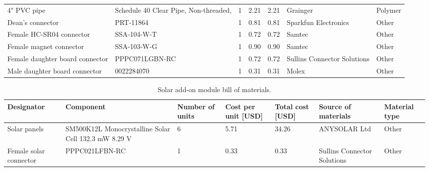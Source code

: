 \documentclass[11pt,letterpaper]{article}
\begin{document}
\begin{longtable}{ p{1.75cm} p{4cm} p{1.25cm} p{1cm} p{1cm} p{2cm} p{2.5cm} }
	\rowcolor[gray]{0.925}
	4" PVC pipe & Schedule 40 Clear Pipe, Non-threaded,  & 1 & 2.21 & 2.21 & Grainger & Polymer \\  

	Dean's connector & PRT-11864  & 1 & 0.81 & 0.81 & Sparkfun Electronics & Other \\
	
	\rowcolor[gray]{0.925}
	Female HC-SR04 connector & SSA-104-W-T & 1 & 0.72 & 0.72 & Samtec & Other \\ 
	
	Female magnet connector & SSA-103-W-G & 1 & 0.90 & 0.90 & Samtec & Other \\ 
	
	\rowcolor[gray]{0.925}
	Female daughter board connector & PPPC071LGBN-RC & 1 & 0.72 & 0.72 & Sullins Connector Solutions & Other \\

	Male daughter board connector & 0022284070 & 1 & 0.31 & 0.31 & Molex & Other \\ 
	
	\bottomrule
\end{longtable}

\pagebreak

\begin{longtable}{ p{1.75cm} p{4cm} p{1.25cm} p{1cm} p{1cm} p{2cm} p{2.5cm} }	
	\caption{Solar add-on module bill of materials.} 
	\label{solar_components} \\
	\toprule
	Designator & Component & Number of units & Cost per unit [USD] & Total cost [USD] & Source of materials & Material type \\
	\midrule
	
	Solar panels & SM500K12L Monocrystalline Solar Cell 132.3 mW 8.29 V & 6 & 5.71 & 34.26 & ANYSOLAR Ltd & Other \\
	
	\rowcolor[gray]{0.925}
	Female solar connector & PPPC021LFBN-RC & 1 & 0.33 & 0.33 & Sullins Connector Solutions & Other \\
	
	\bottomrule
\end{longtable}
\end{document}
